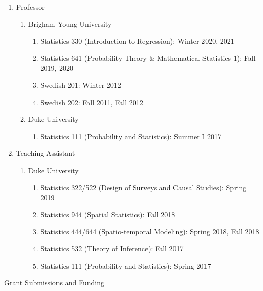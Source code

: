 \documentclass[12pt]{article}
\newcommand{\head}[1]{ %
    \bigskip %
    \begin{large}\begin{bf}{#1}\end{bf}\end{large} %

    \ \\ [-1.3cm] %

    \hrulefill}
\begin{document}
\begin{enumerate}[label=$\bullet$]
\item Professor
\begin{enumerate}[label=$\cdot$]
\item Brigham Young University
\begin{enumerate}[label=$\cdot$]
\item Statistics 330 (Introduction to Regression): Winter 2020, 2021
\item Statistics 641 (Probability Theory \& Mathematical Statistics 1): Fall 2019, 2020
\item Swedish 201: Winter 2012 
\item Swedish 202: Fall 2011, Fall 2012
\end{enumerate}
\item Duke University
\begin{enumerate}[label=$\cdot$]
\item Statistics 111 (Probability and Statistics): Summer I 2017
\end{enumerate}
\end{enumerate}
\item Teaching Assistant
\begin{enumerate}[label=$\cdot$]
\item Duke University
\begin{enumerate}[label=$\cdot$]
\item Statistics 322/522 (Design of Surveys and Causal Studies): Spring 2019
\item Statistics 944 (Spatial Statistics): Fall 2018
\item Statistics 444/644 (Spatio-temporal Modeling): Spring 2018, Fall 2018
\item Statistics 532 (Theory of Inference): Fall 2017
\item Statistics 111 (Probability and Statistics): Spring 2017 
\end{enumerate}
\end{enumerate}
\end{enumerate}

\head{Grant Submissions and Funding}
\end{document}
